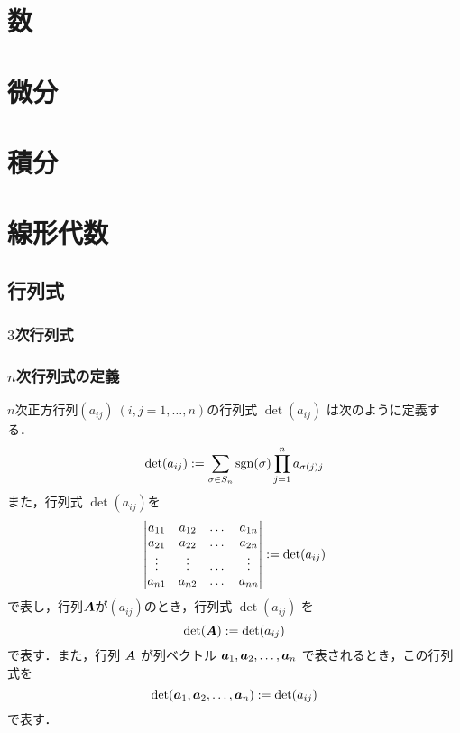 \documentclass{book}　%
\begin{document}
	\tableofcontents
	\part{数}
	\part{微分}
	\part{積分}
	\part{線形代数}
		\chapter{行列式}
			\section{$3$次行列式}
			\section{$n$次行列式の定義}
				\begin{dfn} $n$次正方行列$(a_{i j}) \ (i,j = 1 ,\dots,n)$の行列式 $\det(a_{ij})$ は次のように定義する．
					\begin{equation}
						\det(a_{i j}) := \sum_{\sigma \in S_n} \operatorname{\mathrm{sgn}}(\sigma) \prod_{j=1}^{n} a_{\sigma(j) j}
					\end{equation}
					また，行列式 $\det(a_{i j})$を
					\begin{equation}
						\begin{vmatrix}
							a_{1 1} & a_{1 2} & \dots & a_{1 n} \\
							a_{2 1} & a_{2 2} & \dots & a_{2 n} \\
							\vdots & \vdots & \dots & \vdots \\
							a_{n 1} & a_{n 2} & \dots & a_{n n}
						\end{vmatrix}
						:= \det(a_{i j})
					\end{equation}
					で表し，行列$\boldsymbol{A}$が$(a_{i j})$のとき，行列式 $\det(a_{i j})$ を
					\begin{equation}
						\det(\boldsymbol{A}) := \det(a_{i j})
					\end{equation}
					で表す．また，行列 $\boldsymbol{A}$ が列ベクトル $\boldsymbol{a}_1, \boldsymbol{a}_2, \dots, \boldsymbol{a}_n$ で表されるとき，この行列式を
					\begin{equation}
						\det(\boldsymbol{a}_1,\boldsymbol{a}_2, \dots, \boldsymbol{a}_n) := \det(a_{i j})
					\end{equation}
					で表す．
				\end{dfn}
\end{document}
